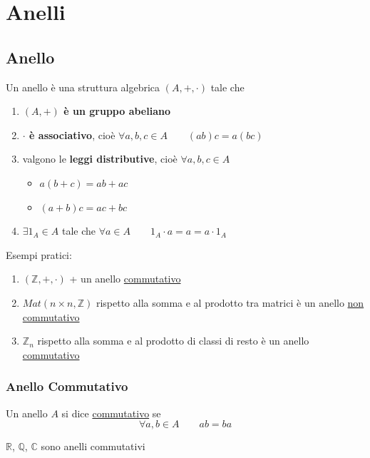 \documentclass[a4paper,12pt, oneside]{book}
\begin{document}
	\section{Anelli}
		\subsection{Anello}
			\begin{definizione}[Anello]
				Un anello è una struttura algebrica $(A,+, \cdot)$ tale che 
				\begin{enumerate}
					\item \textbf{$(A,+)$ è un gruppo abeliano}
					\item \textbf{$\cdot$ è associativo}, cioè $\forall a,b,c \in A \qquad (ab)c=a(bc)$
					\item valgono le \textbf{leggi distributive}, cioè $\forall a,b,c \in A$
						\begin{itemize}
							\item $a(b+c)=ab+ac$
							\item $(a+b)c=ac+bc$
						\end{itemize}
					\item \textbf{$\exists 1_A \in A$} tale che $\forall a \in A \qquad 1_A \cdot a = a = a \cdot 1_A$
				\end{enumerate}
			\end{definizione}
			
			\begin{shaded}
				\begin{esempio}
					Esempi pratici:
					\begin{enumerate}
						\item $(\mathbb{Z}, +, \cdot)$ + un anello \underline{commutativo}
						\item $Mat(n \times n, \mathbb{Z})$ rispetto alla somma e al prodotto tra matrici è un anello \underline{non commutativo}
						\item $\mathbb{Z}_n$ rispetto alla somma e al prodotto di classi di resto è un anello \underline{commutativo}
					\end{enumerate}
				\end{esempio}
			\end{shaded}
		
		\subsubsection{Anello Commutativo}
			\begin{definizione}
				Un anello $A$ si dice \underline{commutativo} se $$\forall a,b \in A \qquad ab=ba$$
			\end{definizione}
			\begin{shaded}
				\begin{esempio}
					$\mathbb{R}$, $\mathbb{Q}$, $\mathbb{C}$ sono anelli commutativi
				\end{esempio}
			\end{shaded}
			
\end{document}
